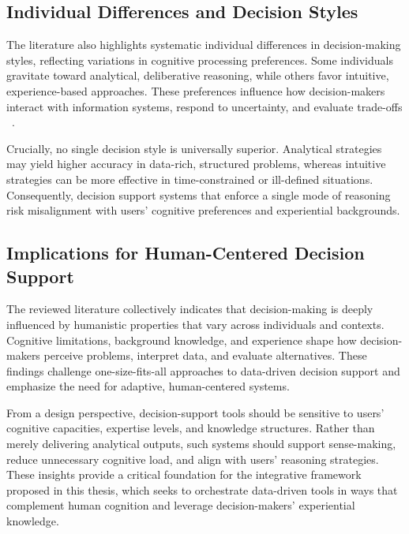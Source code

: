 \documentclass{sfuthesis}
\begin{document}
\subsection{Individual Differences and Decision Styles}
The literature also highlights systematic individual differences in decision-making styles, reflecting variations in cognitive processing preferences. Some individuals gravitate toward analytical, deliberative reasoning, while others favor intuitive, experience-based approaches. These preferences influence how decision-makers interact with information systems, respond to uncertainty, and evaluate trade-offs ~\cite{parker-tomlin_factors_2019}.\par
Crucially, no single decision style is universally superior. Analytical strategies may yield higher accuracy in data-rich, structured problems, whereas intuitive strategies can be more effective in time-constrained or ill-defined situations. Consequently, decision support systems that enforce a single mode of reasoning risk misalignment with users’ cognitive preferences and experiential backgrounds.
\subsection{Implications for Human-Centered Decision Support}
The reviewed literature collectively indicates that decision-making is deeply influenced by humanistic properties that vary across individuals and contexts. Cognitive limitations, background knowledge, and experience shape how decision-makers perceive problems, interpret data, and evaluate alternatives. These findings challenge one-size-fits-all approaches to data-driven decision support and emphasize the need for adaptive, human-centered systems.\par
From a design perspective, decision-support tools should be sensitive to users’ cognitive capacities, expertise levels, and knowledge structures. Rather than merely delivering analytical outputs, such systems should support sense-making, reduce unnecessary cognitive load, and align with users’ reasoning strategies. These insights provide a critical foundation for the integrative framework proposed in this thesis, which seeks to orchestrate data-driven tools in ways that complement human cognition and leverage decision-makers’ experiential knowledge.
\end{document}
